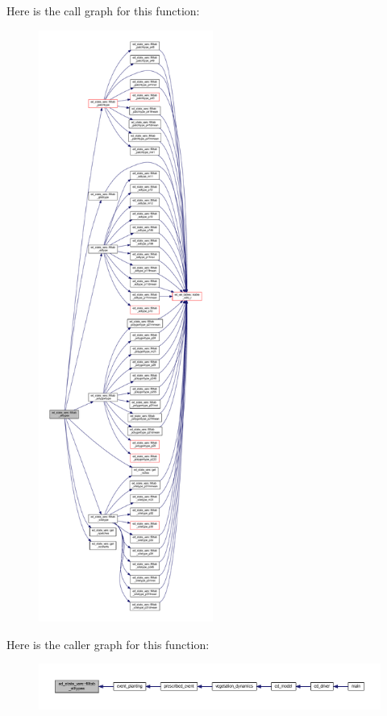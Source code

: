 Here is the call graph for this function\+:\nopagebreak
\begin{figure}[H]
\begin{center}
\leavevmode
\includegraphics[height=550pt]{namespaceed__state__vars_afdc01451213108f52d4c3ac14a804f74_cgraph}
\end{center}
\end{figure}




Here is the caller graph for this function\+:\nopagebreak
\begin{figure}[H]
\begin{center}
\leavevmode
\includegraphics[width=350pt]{namespaceed__state__vars_afdc01451213108f52d4c3ac14a804f74_icgraph}
\end{center}
\end{figure}


